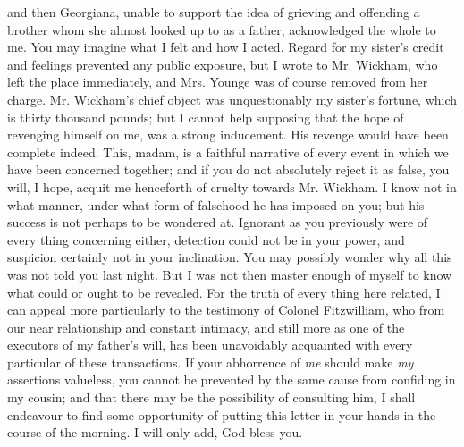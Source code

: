 \begin{letter}
and then Georgiana, unable to support the idea of grieving
and offending a brother whom she almost looked up to
as a father, acknowledged the whole to me. You may
imagine what I felt and how I acted. Regard for my
sister’s credit and feelings prevented any public exposure,
but I wrote to Mr. Wickham, who left the place immediately,
and Mrs. Younge was of course removed from her
charge. Mr. Wickham’s chief object was unquestionably
my sister’s fortune, which is thirty thousand pounds;
but I cannot help supposing that the hope of revenging
himself on me, was a strong inducement. His revenge
would have been complete indeed. This, madam, is a
faithful narrative of every event in which we have been
concerned together; and if you do not absolutely reject
it as false, you will, I hope, acquit me henceforth of cruelty
towards Mr. Wickham. I know not in what manner, under
what form of falsehood he has imposed on you; but his
success is not perhaps to be wondered at. Ignorant as you
previously were of every thing concerning either, detection
could not be in your power, and suspicion certainly
not in your inclination. You may possibly wonder why
all this was not told you last night. But I was not then
master enough of myself to know what could or ought
to be revealed. For the truth of every thing here related,
I can appeal more particularly to the testimony of Colonel
Fitzwilliam, who from our near relationship and constant
intimacy, and still more as one of the executors of my
father’s will, has been unavoidably acquainted with every
particular of these transactions. If your abhorrence of
\textit{me} should make \textit{my} assertions valueless, you cannot be
prevented by the same cause from confiding in my cousin;
and that there may be the possibility of consulting him,
I shall endeavour to find some opportunity of putting this
letter in your hands in the course of the morning. I will
only add, God bless you.

\end{letter}



